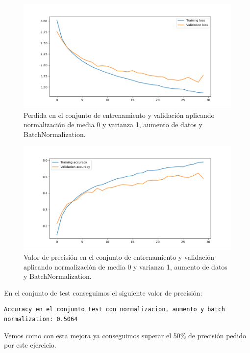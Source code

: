 \documentclass[12pt, spanish]{article}
\begin{document}
\begin{figure}[H]
  \centering
      \includegraphics[width=\textwidth]{1-2-batch.png}
 		\caption{Perdida en el conjunto de entrenamiento y validación aplicando normalización de media 0 y varianza 1, aumento de datos y BatchNormalization.}
\end{figure}

\begin{figure}[H]
  \centering
      \includegraphics[width=\textwidth]{1-2-batch-2.png}
 		\caption{Valor de precisión en el conjunto de entrenamiento y validación aplicando normalización de media 0 y varianza 1, aumento de datos y BatchNormalization.}
\end{figure}



En el conjunto de test conseguimos el siguiente valor de precisión:

\begin{lstlisting}
Accuracy en el conjunto test con normalizacion, aumento y batch normalization: 0.5064
\end{lstlisting}

Vemos como con esta mejora ya conseguimos superar el 50\% de precisión pedido por este ejercicio.
\end{document}
